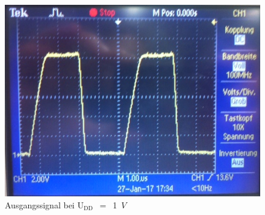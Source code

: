 \begin{figure}[!h]
\begin{center}
\begin{minipage}[t]{0.5\textwidth}
\includegraphics[width=\textwidth]{bild/Inverter1V}
\end{minipage}
\caption{Ausgangssignal bei U$_{\text{DD}}$~$=$~1~$V$}
\end{center}
\end{figure}
